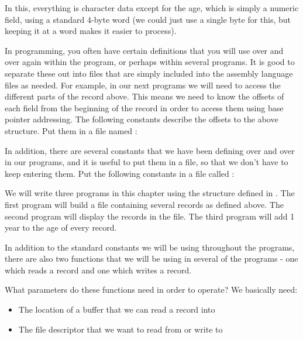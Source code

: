 In this, everything is character data except for the age, which is
simply a numeric field, using a standard 4-byte word (we could just
use a single byte for this, but keeping it at a word makes it easier
to process).

In programming, you often have certain definitions that you will use
over and over again within the program, or perhaps within several
programs.  It is good to separate these out into files that are 
simply included into the assembly language files as needed.  For
example, in our next programs we will need to access the different
parts of the record above.  This means we need to know the offsets
of each field from the beginning of the record in order to access 
them using base pointer addressing.
The following constants describe the offsets to the above structure.
Put them in a file named
:

\begin{simpletyping}

\end{simpletyping}

In addition, there are several constants that we have been defining over
and over in our programs, and it is useful to put them in a file, so that
we don't have to keep entering them.  Put the following
constants in a file called :

\begin{simpletyping}

\end{simpletyping}

We will write three programs in this chapter using the structure defined in .
The first program will build a file containing several records as defined
above. The second program will display the records in the file.  The 
third program will add
1 year to the age of every record.

In addition to the standard constants we will be using throughout the
programs, there are also two functions that we will be using in 
several of the programs - one which reads a record and one which
writes a record.

What parameters do these functions need in order to operate?  We
basically need:

\begin{itemize}\item The location of a buffer that we can read a record into 
\item The file descriptor that we want to read from or write to 
\end{itemize}

